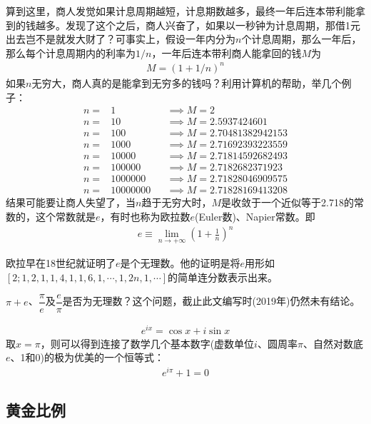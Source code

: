 算到这里，商人发觉如果计息周期越短，计息期数越多，最终一年后连本带利能拿到的钱越多。发现了这个之后，商人兴奋了，如果以一秒钟为计息周期，那借1元出去岂不是就发大财了？可事实上，假设一年内分为$n$个计息周期，那么一年后，那么每个计息周期内的利率为$1/n$，一年后连本带利商人能拿回的钱$M$为
\begin{align*}
  M=(1+1/n)^n
\end{align*}
如果$n$无穷大，商人真的是能拿到无穷多的钱吗？利用计算机的帮助，举几个例子：
\begin{align*}
  n=&1       &&\implies M=2 \\
  n=&10      &&\implies M=2.5937424601\\
  n=&100     &&\implies M=2.70481382942153\\
  n=&1000    &&\implies M=2.71692393223559\\
  n=&10000   &&\implies M=2.71814592682493\\
  n=&100000  &&\implies M=2.7182682371923\\
  n=&1000000 &&\implies M=2.71828046909575\\
  n=&10000000&&\implies M=2.71828169413208
\end{align*}
结果可能要让商人失望了，当$n$趋于无穷大时，$M$是收敛于一个近似等于2.718的常数的，这个常数就是$e$，有时也称为欧拉数$e$(Euler数)、Napier常数。即
\begin{align*}
  e\equiv\lim_{n\to+\infty} \left(1+\frac1n\right)^n
\end{align*}

欧拉早在18世纪就证明了$e$是个无理数。他的证明是将$e$用形如$[2;1,2,1,1,4,1,1,6,1,\cdots,1,2n,1,\cdots]$的简单连分数表示出来。

\begin{question}
  $\pi + e$、$\dfrac{\pi}{e}$及$\dfrac{e}{\pi}$是否为无理数？这个问题，截止此文编写时(2019年)仍然未有结论。
\end{question}

\begin{theorem}
  \begin{align*}
  e^{ix}=\cos x + i\sin x
  \end{align*}
  取$x=\pi$，则可以得到连接了数学几个基本数字(虚数单位$i$、圆周率$\pi$、自然对数底$e$、1和0)的极为优美的一个恒等式：
  \begin{align*}
    e^{i\pi} + 1 = 0
  \end{align*}
\end{theorem}

\subsection{黄金比例}
\label{sec:irrational-number-golden-ratio}

